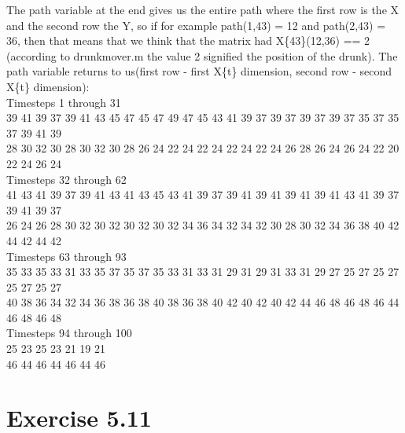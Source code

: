 \documentclass[11pt,a4paper,oneside]{report}
\begin{document}
The path variable at the end gives us the entire path where the first row is the X and the second row the Y, so if for example path(1,43) = 12 and path(2,43) = 36, then that means that we think that the matrix had X\{43\}(12,36) == 2 (according to drunkmover.m the value 2 signified the position of the drunk). The path variable returns to us(first row - first X\{t\} dimension, second row - second X\{t\} dimension):\\

Timesteps 1 through 31\\
39    41    39    37    39    41    43    45    47    45    47    49    47    45    43    41    39    37    39    37    39    37    39    37    35    37    35    37    39    41    39\\
28    30    32    30    28    30    32    30    28    26    24    22    24    22    24    22    24    22    24    26    28    26    24    26    24    22    20    22    24    26    24\\

Timesteps 32 through 62\\
41    43    41    39    37    39    41    43    41    43    45    43    41    39    37    39    41    39    41    39    41    39    41    43    41    39    37    39    41    39    37\\
26    24    26    28    30    32    30    32    30    32    30    32    34    36    34    32    34    32    30    28    30    32    34    36    38    40    42    44    42    44    42\\

Timesteps 63 through 93\\
35    33    35    33    31    33    35    37    35    37    35    33    31    33    31    29    31    29    31    33    31    29    27    25    27    25    27    25    27    25    27\\
40    38    36    34    32    34    36    38    36    38    40    38    36    38    40    42    40    42    40    42    44    46    48    46    48    46    44    46    48    46    48\\

Timesteps 94 through 100\\
25    23    25    23    21    19    21\\
46    44    46    44    46    44    46\\%

\section*{Exercise 5.11}	
\end{document}
